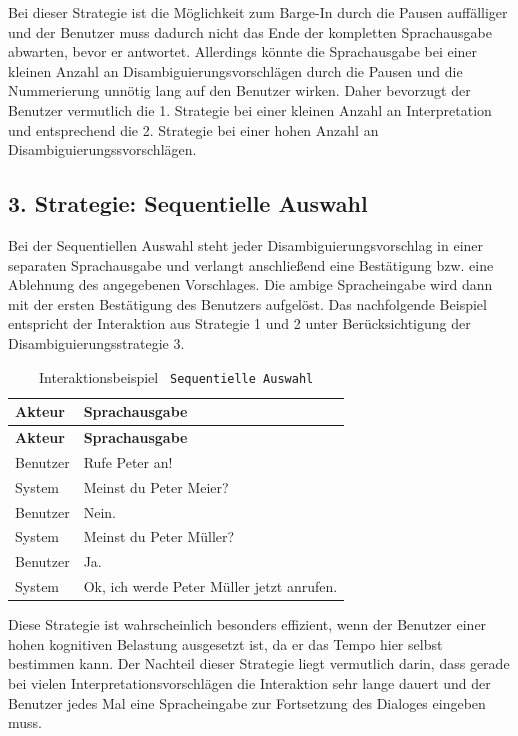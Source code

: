 \documentclass[12pt,a4paper]{scrartcl}
\begin{document}
Bei dieser Strategie ist die Möglichkeit zum Barge-In durch die Pausen auffälliger und der Benutzer muss dadurch nicht das Ende der kompletten Sprachausgabe abwarten, bevor er antwortet. Allerdings könnte die Sprachausgabe bei einer kleinen Anzahl an Disambiguierungsvorschlägen durch die Pausen und die Nummerierung unnötig lang auf den Benutzer wirken. Daher bevorzugt der Benutzer vermutlich die 1. Strategie bei einer kleinen Anzahl an Interpretation und entsprechend die 2. Strategie bei einer hohen Anzahl an Disambiguierungssvorschlägen.

\subsection{3. Strategie: Sequentielle Auswahl}
Bei der Sequentiellen Auswahl steht jeder Disambiguierungsvorschlag in einer separaten Sprachausgabe und verlangt anschließend eine Bestätigung bzw. eine Ablehnung des angegebenen Vorschlages. Die ambige Spracheingabe wird dann mit der ersten Bestätigung des Benutzers aufgelöst. Das nachfolgende Beispiel entspricht der Interaktion aus Strategie 1 und 2 unter Berücksichtigung der Disambiguierungsstrategie 3. 

\begin{longtable}{p{6cm}p{8cm}}
	\caption[Interaktionsbeispiel \texttt{Sequentielle Auswahl}]{Interaktionsbeispiel \texttt{ Sequentielle Auswahl}}\\
	\hline
	\textbf{Akteur} &	\textbf{Sprachausgabe}\\
	\hline
	\endfirsthead
	\hline
	\textbf{Akteur} &	\textbf{Sprachausgabe}\\
	\hline
	\endhead
Benutzer & Rufe Peter an!\\
System & Meinst du Peter Meier?\\
Benutzer & Nein.\\
System & Meinst du Peter Müller?\\
Benutzer & Ja.\\
System & Ok, ich werde Peter Müller jetzt anrufen.\\

\hline
\end{longtable}

Diese Strategie ist wahrscheinlich besonders effizient, wenn der Benutzer einer hohen kognitiven Belastung ausgesetzt ist, da er das Tempo hier selbst bestimmen kann. Der Nachteil dieser Strategie liegt vermutlich darin, dass gerade bei vielen Interpretationsvorschlägen die Interaktion sehr lange dauert und der Benutzer jedes Mal eine Spracheingabe zur Fortsetzung des Dialoges eingeben muss. 
\end{document}
